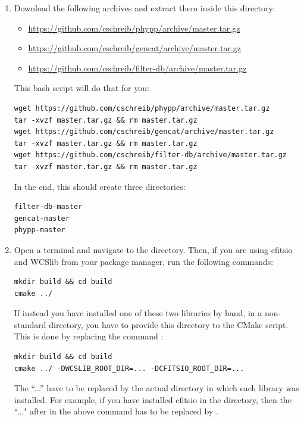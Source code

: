 \documentclass[12pt,a4paper]{article}
\begin{document}
\begin{enumerate}
\item Download the following archives and extract them inside this directory:
\begin{itemize}
\item \url{https://github.com/cschreib/phypp/archive/master.tar.gz}
\item \url{https://github.com/cschreib/gencat/archive/master.tar.gz}
\item \url{https://github.com/cschreib/filter-db/archive/master.tar.gz}
\end{itemize}

This bash script will do that for you:
\begin{verbatim}
wget https://github.com/cschreib/phypp/archive/master.tar.gz
tar -xvzf master.tar.gz && rm master.tar.gz
wget https://github.com/cschreib/gencat/archive/master.tar.gz
tar -xvzf master.tar.gz && rm master.tar.gz
wget https://github.com/cschreib/filter-db/archive/master.tar.gz
tar -xvzf master.tar.gz && rm master.tar.gz
\end{verbatim}

In the end, this should create three directories:
\begin{verbatim}
filter-db-master
gencat-master
phypp-master
\end{verbatim}

\item Open a terminal and navigate to the  directory. Then, if you are using cfitsio and WCSlib from your package manager, run the following commands:
\begin{verbatim}
mkdir build && cd build
cmake ../
\end{verbatim}

If instead you have installed one of these two libraries by hand, in a non-standard directory, you have to provide this directory to the CMake script. This is done by replacing the command :
\begin{verbatim}
mkdir build && cd build
cmake ../ -DWCSLIB_ROOT_DIR=... -DCFITSIO_ROOT_DIR=...
\end{verbatim}

The ``...'' have to be replaced by the actual directory in which each library was installed. For example, if you have installed cfitsio in the  directory, then the ``..." after  in the above command has to be replaced by .


\end{enumerate}
\end{document}
